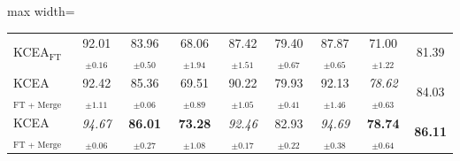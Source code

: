 \begin{adjustbox}{max width=\textwidth}
\begin{tabular}{l c c c c c c c c}
\midrule
KCEA$_{\text{FT}}$ & 92.01$_{\pm 0.16}$ & 83.96$_{\pm 0.50}$ & 68.06$_{\pm 1.94}$ & 87.42$_{\pm 1.51}$ & 79.40$_{\pm 0.67}$ & 87.87$_{\pm 0.65}$ & 71.00$_{\pm 1.22}$ & 81.39 \\
KCEA$_{\text{FT + Merge}}$ & 92.42$_{\pm 1.11}$ & 85.36$_{\pm 0.06}$ & 69.51$_{\pm 0.89}$ & 90.22$_{\pm 1.05}$ & 79.93$_{\pm 0.41}$ & 92.13$_{\pm 1.46}$ & \textit{78.62}$_{\pm 0.63}$ & 84.03 \\
KCEA$_{\text{FT + Merge + Align}}$ & \textit{94.67}$_{\pm 0.06}$ & \textbf{86.01}$_{\pm 0.27}$ & \textbf{73.28}$_{\pm 1.08}$ & \textit{92.46}$_{\pm 0.17}$ & 82.93$_{\pm 0.22}$ & \textit{94.69}$_{\pm 0.38}$ & \textbf{78.74}$_{\pm 0.64}$ & \textbf{86.11} \\
\bottomrule
\end{tabular}
\end{adjustbox}